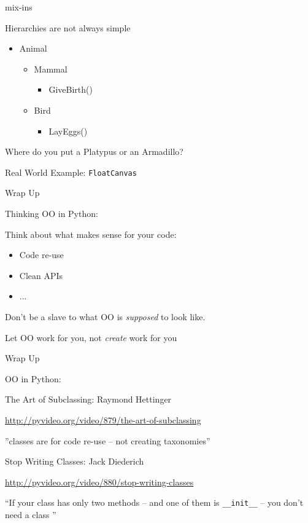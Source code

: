 \documentclass{beamer}
\begin{document}
\begin{frame}[fragile]{mix-ins}

\vfill
{\Large Hierarchies are not always simple}
\vfill
\begin{itemize}
  \item Animal
  \begin{itemize}
    \item Mammal
    \begin{itemize}
      \item GiveBirth()
    \end{itemize}
    \item Bird
    \begin{itemize}
      \item LayEggs()
    \end{itemize}
  \end{itemize}
\end{itemize}
\vfill
{\Large Where do you put a Platypus or an Armadillo?}

\vfill
{\Large Real World Example: \verb|FloatCanvas|}
\end{frame} 

\begin{frame}[fragile]{Wrap Up}

{\LARGE Thinking OO in Python:}

\vfill
{\large Think about what makes sense for your code:}
\begin{itemize}
  \item {\large Code re-use}
  \item {\large Clean APIs}
  \item {\large ... }
\end{itemize}

\vfill
{\large Don't be a slave to what OO is \emph{supposed} to look like. }

\vfill
{\large Let OO work for you, not \emph{create} work for you}

\end{frame}


\begin{frame}[fragile]{Wrap Up}

{\Large OO in Python:}

\vfill
{\Large The Art of Subclassing}: Raymond Hettinger

\vfill
{\small \url{http://pyvideo.org/video/879/the-art-of-subclassing}}

\vfill
''classes are for code re-use -- not creating taxonomies''

\vfill
{\Large Stop Writing Classes}: Jack Diederich

\vfill
{\small \url{http://pyvideo.org/video/880/stop-writing-classes}}

\vfill
``If your class has only two methods -- and one of them is \verb|__init__|
-- you don't need a class ''
\end{frame}
\end{document}
